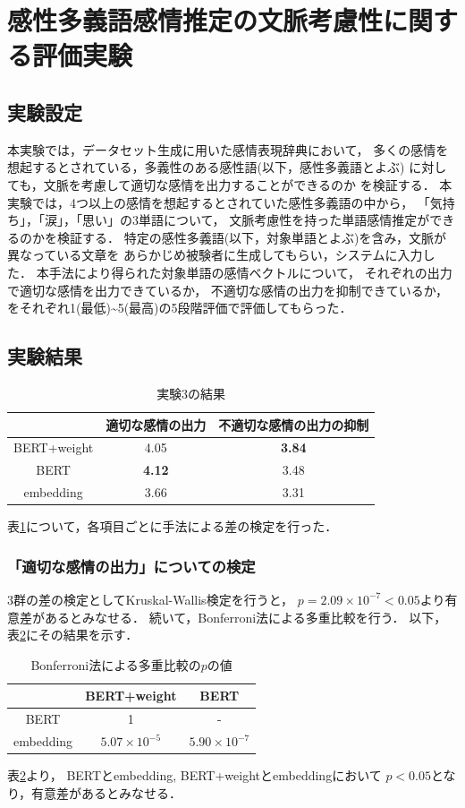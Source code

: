 \section{感性多義語感情推定の文脈考慮性に関する評価実験}
	\subsection{実験設定}
	本実験では，データセット生成に用いた感情表現辞典において，
	多くの感情を想起するとされている，多義性のある感性語(以下，感性多義語とよぶ)
	に対しても，文脈を考慮して適切な感情を出力することができるのか
	を検証する．
	本実験では，4つ以上の感情を想起するとされていた感性多義語の中から，
	「気持ち」，「涙」，「思い」の3単語について，
	文脈考慮性を持った単語感情推定ができるのかを検証する．
	特定の感性多義語(以下，対象単語とよぶ)を含み，文脈が異なっている文章を
	あらかじめ被験者に生成してもらい，システムに入力した．
	本手法により得られた対象単語の感情ベクトルについて，
	それぞれの出力で適切な感情を出力できているか，
	不適切な感情の出力を抑制できているか，
	をそれぞれ1(最低)\textasciitilde5(最高)の5段階評価で評価してもらった．
	

	\subsection{実験結果}
	\begin{table}[H]
		\centering
		\caption{実験3の結果}
		\label{kansei_tagigo_result}
			\begin{tabular}{ccc}
				\hline
				& 適切な感情の出力 & 不適切な感情の出力の抑制 \\
				\hline \hline
				BERT+weight & 4.05 & \textbf{3.84} \\
				BERT & \textbf{4.12} & 3.48 \\
				embedding & 3.66 & 3.31 \\
				\hline
			\end{tabular}
	\end{table}

	表\ref{kansei_tagigo_result}について，各項目ごとに手法による差の検定を行った．
	\subsubsection{「適切な感情の出力」についての検定}
		3群の差の検定としてKruskal-Wallis検定を行うと，
		$p=2.09\times10^{-7}<0.05$より有意差があるとみなせる．
		続いて，Bonferroni法による多重比較を行う．
		以下，表\ref{table:jikken3_good_Bonferroni}にその結果を示す．
		\begin{table}[H]
			\centering
			\caption{Bonferroni法による多重比較の$p$の値}
			\label{table:jikken3_good_Bonferroni}
			\begin{tabular}{|c|c|c|}
				\hline
				& BERT+weight & BERT \\
				\hline
				BERT & 1 & - \\
				\hline
				embedding & $5.07\times10^{-5}$ & $5.90\times10^{-7}$ \\
				\hline
			\end{tabular}
		\end{table}
		表\ref{table:jikken3_good_Bonferroni}より，
		BERTとembedding, BERT+weightとembeddingにおいて
		$p<0.05$となり，有意差があるとみなせる．


